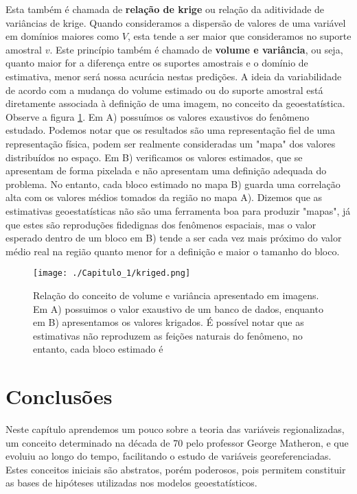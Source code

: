 Esta também é chamada de \textbf{relação de krige} ou relação da aditividade de variâncias de krige. Quando consideramos a dispersão de valores de uma variável em domínios maiores como $V$, esta tende a ser maior que consideramos no suporte amostral $v$. Este princípio também é chamado de \textbf{volume e variância}, ou seja, quanto maior for a diferença entre os suportes amostrais e o domínio de estimativa, menor será nossa acurácia nestas predições. A ideia da variabilidade de acordo com a mudança do volume estimado ou do suporte amostral está diretamente associada à definição de uma imagem, no conceito da geoestatística.  Observe a figura \ref{volume_var}. Em A) possuímos os valores exaustivos do fenômeno estudado. Podemos notar que os resultados são uma representação fiel de uma representação física, podem ser realmente consideradas um "mapa" dos valores distribuídos no espaço. Em B) verificamos os valores estimados, que se apresentam de forma pixelada e não apresentam uma definição adequada do problema. No entanto, cada bloco estimado no mapa B) guarda uma correlação alta com os valores médios tomados da região no mapa A). Dizemos que as estimativas geoestatísticas não são uma ferramenta boa para produzir "mapas", já que estes são reproduções fidedignas dos fenômenos espaciais, mas o valor esperado dentro de um bloco em B) tende a ser cada vez mais próximo do valor médio real na região quanto menor for a definição e maior o tamanho do bloco. 

\FloatBarrier
\begin{figure}[!htb]
	\centering
	\texttt{[image: ./Capitulo\_1/kriged.png]}	
	\caption{Relação do conceito de volume e variância apresentado em imagens. Em A) possuimos o valor exaustivo de um banco de dados, enquanto em B) apresentamos os valores krigados. É possível notar que as estimativas não reproduzem as feições naturais do fenômeno, no entanto, cada bloco estimado é  } 
	\label{volume_var}
\end{figure}
\FloatBarrier



\section{Conclusões} 

Neste capítulo aprendemos um pouco sobre a teoria das variáveis regionalizadas, um conceito determinado na década de 70 pelo professor George Matheron, e que evoluiu ao longo do tempo, facilitando o estudo de variáveis georeferenciadas. Estes conceitos iniciais são abstratos, porém poderosos, pois permitem constituir as bases de hipóteses utilizadas nos modelos geoestatísticos. 


